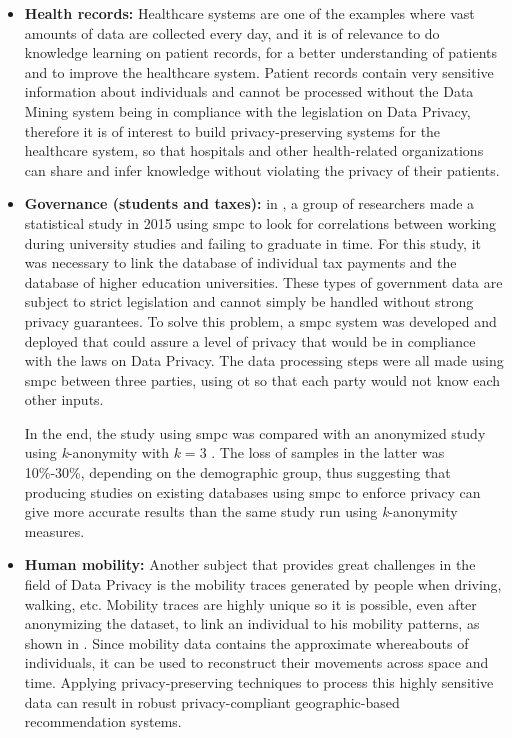 \begin{itemize}
	
	\item \textbf{Health records:} Healthcare systems are one of the examples where vast amounts of data are collected every day, and it is of relevance to do knowledge learning on patient records, for a better understanding of patients and to improve the healthcare system. Patient records contain very sensitive information about individuals and cannot be processed without the Data Mining system being in compliance with the legislation on Data Privacy, therefore it is of interest to build privacy-preserving systems for the healthcare system, so that hospitals and other health-related organizations can share and infer knowledge without violating the privacy of their patients.

	\item \textbf{Governance (students and taxes):} in \cite{Bogdanov2015}, a group of researchers made a statistical study in 2015 using \ac{smpc} to look for correlations between working during university studies and failing to graduate in time. For this study, it was necessary to link the database of individual tax payments and the database of higher education universities. These types of government data are subject to strict legislation and cannot simply be handled without strong privacy guarantees.
    To solve this problem, a \ac{smpc} system was developed and deployed that could assure a level of privacy that would be in compliance with the laws on Data Privacy. The data processing steps were all made using \ac{smpc} between three parties, using \ac{ot} so that each party would not know each other inputs.
    
    In the end, the study using \ac{smpc} was compared with an anonymized study using \textit{k}-anonymity with $\textit{k}=3$ . The loss of samples in the latter was 10\%-30\%, depending on the demographic group, thus suggesting that producing studies on existing databases using \ac{smpc} to enforce privacy can give more accurate results than the same study run using \textit{k}-anonymity measures.

	\item \textbf{Human mobility:} Another subject that provides great challenges in the field of Data Privacy is the mobility traces generated by people when driving, walking, etc. Mobility traces are highly unique so it is possible, even after anonymizing the dataset, to link an individual to his mobility patterns, as shown in \cite{de2013unique}. Since mobility data contains the approximate whereabouts of individuals, it can be used to reconstruct their movements across space and time. Applying privacy-preserving techniques to process this highly sensitive data can result in robust privacy-compliant geographic-based recommendation systems.
\end{itemize}


